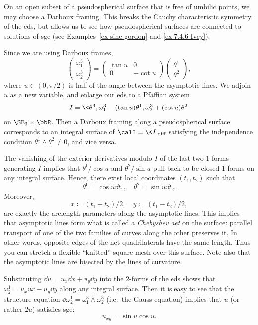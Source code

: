 On an open subset of a pseudospherical surface that is free of umbilic points, we may choose a Darboux framing. This breaks the Cauchy characteristic symmetry of the \gls{eds}, but allows us to see how pseudospherical surfaces are connected to solutions of \gls{sge} (see Examples~\ref{ex sine-gordon} and \ref{ex 7.4.6 Ivey}).

Since we are using Darboux frames,
\[\begin{pmatrix}
    \omega^3_1\\\omega^3_2
\end{pmatrix}=\begin{pmatrix}
    \tan u & 0\\
    0 & -\cot u
\end{pmatrix}\begin{pmatrix}
    \theta^1\\\theta^2
\end{pmatrix},\]
where $u\in (0,\pi/2)$ is half of the angle between the asymptotic lines. We adjoin $u$ as a new variable, and enlarge our \gls{eds} to a Pfaffian system 
\[I=\<\theta^3,\omega^3_1-(\tan u)\theta^1,\omega^3_2+(\cot u)\theta^2\>\]
on $\SE_3\times \bbR$. Then a Darboux framing along a pseudospherical surface corresponds to an integral surface of $\calI=\<I\>_{\mathrm{diff}}$ satisfying the independence condition $\theta^1\wedge\theta^2\neq 0$, and vice versa.

The vanishing of the exterior derivatives modulo $I$ of the last two $1$-forms generating $I$ implies that $\theta^1/\cos u$ and $\theta^2/\sin u$ pull back to be closed $1$-forms on any integral surface. Hence, there exist local coordinates $(t_1,t_2)$ such that 
\[\theta^1=\cos u\dd t_1,\quad \theta^2=\sin u\dd t_2.\]
Moreover, 
\[x\coloneqq (t_1+ t_2)/2,\quad y\coloneqq (t_1-t_2)/2,\] are exactly the arclength parameters along the asymptotic lines. This implies that asymptotic lines form what is called a \emph{Chebyshev net} on the surface: parallel transport of one of the two families of curves along the other preserves it. In other words, opposite edges of the net quadrilaterals have the same length. Thus you can stretch a flexible ``knitted'' square mesh over this surface. Note also that the asymptotic lines are bisected by the lines of curvature.

Substituting $\dd u=u_x\dd x+u_y\dd y$ into the $2$-forms of the \gls{eds} shows that $\omega_2^1=u_x\dd x-u_y\dd y$ along any integral surface. Then it is easy to see that the structure equation $\dd\omega^1_2=\omega^3_1\wedge\omega^3_2$ (i.e.\ the Gauss equation) implies that $u$ (or rather $2u$) satisfies \gls{sge}:
\[u_{xy}=\sin u\cos u.\]

